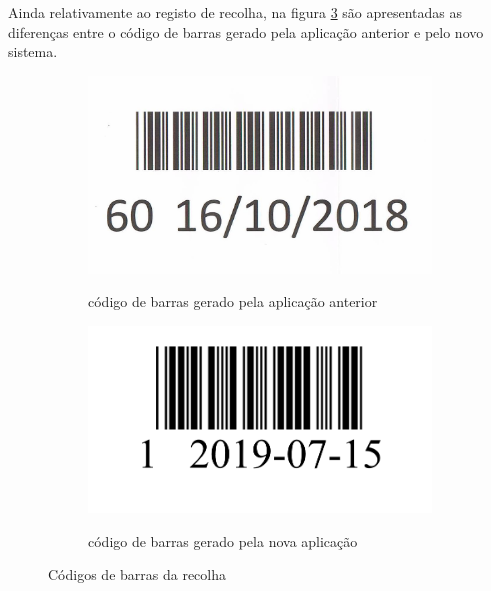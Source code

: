 Ainda relativamente ao registo de recolha, na figura \ref{fig:comparacao_recolhacb} são apresentadas as diferenças entre o código de barras gerado pela aplicação anterior e pelo novo sistema.
\begin{figure}[H]
	\centering
	
	\begin{subfigure}[t]{0.43\linewidth}
		\includegraphics[width=\linewidth]{figuras/AppAccess/2-CodBarras.jpg}
		\label{fig:comparacao_recolhacb_1}
		\caption{código de barras gerado pela aplicação anterior}
	\end{subfigure}
	\begin{subfigure}[t]{0.48\linewidth}
		\includegraphics[width=\linewidth]{figuras/AppPhp/2-CodBarras.png}
		\label{fig:comparacao_recolhacb_2}
		\caption{código de barras gerado pela nova aplicação}
	\end{subfigure}
	
	\caption{Códigos de barras da recolha}
	\label{fig:comparacao_recolhacb}
\end{figure}

